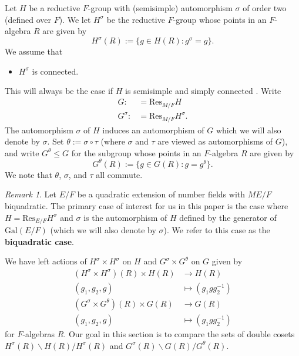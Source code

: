 \documentclass[12pt]{amsart}
\theoremstyle{remark}
\newtheorem*{rem}{Remark}
\numberwithin{equation}{section}
\newcommand{\Gal}{\mathrm{Gal}}
\newcommand{\lto}{\longrightarrow}
\theoremstyle{definition}
\numberwithin{equation}{subsection}
\begin{document}
Let $H$  be a reductive $F$-group with (semisimple) automorphism $\sigma$\index{$\sigma$}
of order two (defined over $F$).  We let $H^{\sigma}$ be the reductive $F$-group whose points in
an $F$-algebra $R$ are given by
$$
H^{\sigma}(R):=\{g \in H(R):g^{\sigma}=g\}.
$$ We assume that
\begin{itemize}
\item $H^{\sigma}$ is connected.
\end{itemize}
This will always be the case if $H$ is semisimple and simply connected \cite[\S 8]{SteinbMem}.
Write
\begin{align}
\nonumber G:&=\mathrm{Res}_{M/F}H\\
\nonumber G^{\sigma}:&=\mathrm{Res}_{M/F}H^{\sigma}.
\end{align}  The automorphism $\sigma$ of $H$ induces an automorphism of $G$ which we will also denote by $\sigma$. Set $\theta:=\sigma \circ \tau$ \index{$\theta$}(where $\sigma$ and $\tau$ are viewed as automorphisms of $G$), and write $G^{\theta} \leq G$ for the subgroup whose points in an $F$-algebra $R$ are given by
$$
G^{\theta}(R):=\{g \in G(R):g=g^{\theta}\}.
$$
We note that $\theta$, $\sigma$, and $\tau$ all commute.
\begin{rem} Let $E/F$ be a quadratic extension of number fields with $ME/F$ biquadratic.
The primary case of interest for us in this paper is the case where  $H=\mathrm{Res}_{E/F}H^{\sigma}$ and $\sigma$ is the automorphism of $H$ defined by the generator of $\Gal(E/F)$ (which we will also denote by $\sigma$).  We refer to this case as the \textbf{biquadratic case}.
\end{rem}

We have left actions of $H^{\sigma} \times H^{\sigma}$ on $H$ and $G^{\sigma} \times G^{\theta}$ on $G$ given by
\begin{align} \label{actionsgalore}
\nonumber (H^{\sigma} \times H^{\sigma})(R) \times H(R) &\lto H(R)\\
(g_1,g_2,g) &\longmapsto (g_1gg_2^{-1})\\
\nonumber(G^{\sigma} \times G^{\theta})(R) \times G(R) &\lto G(R)\\
\nonumber(g_1,g_2,g) &\longmapsto  (g_1gg_2^{-1})
\end{align}
for $F$-algebras $R$.
Our goal in this section is to compare the
sets of double cosets $H^{\sigma}(R) \backslash H(R) /H^{\sigma}(R)$ and
$G^{\sigma}(R) \backslash G(R) /G^{\theta}(R)$.
\end{document}
